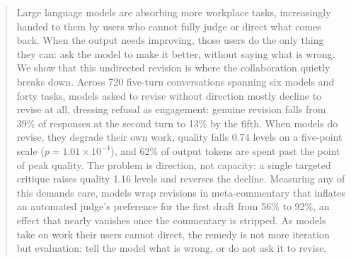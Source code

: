\begin{abstract}
Large language models are absorbing more workplace tasks, increasingly handed to them by users who cannot fully judge or direct what comes back. When the output needs improving, those users do the only thing they can: ask the model to make it better, without saying what is wrong. We show that this undirected revision is where the collaboration quietly breaks down. Across 720 five-turn conversations spanning six models and forty tasks, models asked to revise without direction mostly decline to revise at all, dressing refusal as engagement: genuine revision falls from 39\% of responses at the second turn to 13\% by the fifth. When models do revise, they degrade their own work, quality falls 0.74 levels on a five-point scale ($p = 1.01 \times 10^{-4}$), and 62\% of output tokens are spent past the point of peak quality. The problem is direction, not capacity: a single targeted critique raises quality 1.16 levels and reverses the decline. Measuring any of this demands care, models wrap revisions in meta-commentary that inflates an automated judge's preference for the first draft from 56\% to 92\%, an effect that nearly vanishes once the commentary is stripped. As models take on work their users cannot direct, the remedy is not more iteration but evaluation: tell the model what is wrong, or do not ask it to revise.
\end{abstract}
